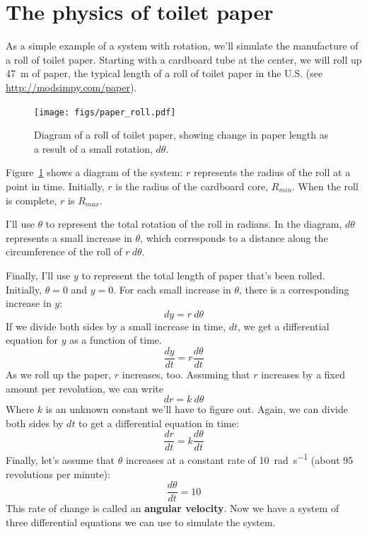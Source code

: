 \documentclass[12pt]{book}
\theoremstyle{exercise}
\begin{document}
\section{The physics of toilet paper}
\label{paper}

As a simple example of a system with rotation, we'll simulate the manufacture of a roll of toilet paper.  Starting with a cardboard tube at the center, we will roll up \SI{47}{\meter} of paper, the typical length of a roll of toilet paper in the U.S. (see \url{http://modsimpy.com/paper}).


\begin{figure}
\centerline{\texttt{[image: figs/paper\_roll.pdf]}}
\caption{Diagram of a roll of toilet paper, showing change in paper length as a result of a small rotation, $d\theta$.}
\label{paper_roll}
\end{figure}

Figure~\ref{paper_roll} shows a diagram of the system: $r$ represents the radius of the roll at a point in time.  Initially, $r$ is the radius of the cardboard core, $R_{min}$.  When the roll is complete, $r$ is $R_{max}$.

I'll use $\theta$ to represent the total rotation of the roll in radians.  In the diagram, $d\theta$ represents a small increase in $\theta$, which corresponds to a distance along the circumference of the roll of $r~d\theta$.


Finally, I'll use $y$ to represent the total length of paper that's been rolled.  Initially, $\theta=0$ and $y=0$.  For each small increase in $\theta$, there is a corresponding increase in $y$:
%
\[ dy = r~d\theta \]
%
If we divide both sides by a small increase in time, $dt$, we get a differential equation for $y$ as a function of time.
%
\[ \frac{dy}{dt} = r \frac{d\theta}{dt} \]
%
As we roll up the paper, $r$ increases, too.  Assuming that $r$ increases by a fixed amount per revolution, we can write
%
\[ dr = k~d\theta \]
%
Where $k$ is an unknown constant we'll have to figure out.  Again, we can divide both sides by $dt$ to get a differential equation in time:
%
\[ \frac{dr}{dt} = k \frac{d\theta}{dt} \]
%
Finally, let's assume that $\theta$ increases at a constant rate of \SI{10}{\radian\per\second} (about 95 revolutions per minute):
%
\[ \frac{d\theta}{dt} = 10  \]
%
This rate of change is called an {\bf angular velocity}.  Now we have a system of three differential equations we can use to simulate the system.
\end{document}
